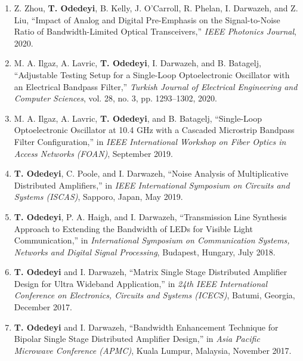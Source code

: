 \documentclass[a4paper,11pt]{article}
\begin{document}
\begin{enumerate}[leftmargin=*]
\item Z. Zhou, \textbf{T. Odedeyi}, B. Kelly, J. O'Carroll, R. Phelan, I. Darwazeh, and Z. Liu, ``Impact of Analog and Digital Pre-Emphasis on the Signal-to-Noise Ratio of Bandwidth-Limited Optical Transceivers,'' \emph{IEEE Photonics Journal}, 2020.

\item M. A. Ilgaz, A. Lavric, \textbf{T. Odedeyi}, I. Darwazeh, and B. Batagelj, ``Adjustable Testing Setup for a Single-Loop Optoelectronic Oscillator with an Electrical Bandpass Filter,'' \emph{Turkish Journal of Electrical Engineering and Computer Sciences}, vol. 28, no. 3, pp. 1293--1302, 2020.

\item M. A. Ilgaz, A. Lavric, \textbf{T. Odedeyi}, and B. Batagelj, ``Single-Loop Optoelectronic Oscillator at 10.4 GHz with a Cascaded Microstrip Bandpass Filter Configuration,'' in \emph{IEEE International Workshop on Fiber Optics in Access Networks (FOAN)}, September 2019.

\item \textbf{T. Odedeyi}, C. Poole, and I. Darwazeh, ``Noise Analysis of Multiplicative Distributed Amplifiers,'' in \emph{IEEE International Symposium on Circuits and Systems (ISCAS)}, Sapporo, Japan, May 2019.

\item \textbf{T. Odedeyi}, P. A. Haigh, and I. Darwazeh, ``Transmission Line Synthesis Approach to Extending the Bandwidth of LEDs for Visible Light Communication,'' in \emph{International Symposium on Communication Systems, Networks and Digital Signal Processing}, Budapest, Hungary, July 2018.

\item \textbf{T. Odedeyi} and I. Darwazeh, ``Matrix Single Stage Distributed Amplifier Design for Ultra Wideband Application,'' in \emph{24th IEEE International Conference on Electronics, Circuits and Systems (ICECS)}, Batumi, Georgia, December 2017.

\item \textbf{T. Odedeyi} and I. Darwazeh, ``Bandwidth Enhancement Technique for Bipolar Single Stage Distributed Amplifier Design,'' in \emph{Asia Pacific Microwave Conference (APMC)}, Kuala Lumpur, Malaysia, November 2017.

\end{enumerate}
\end{document}
